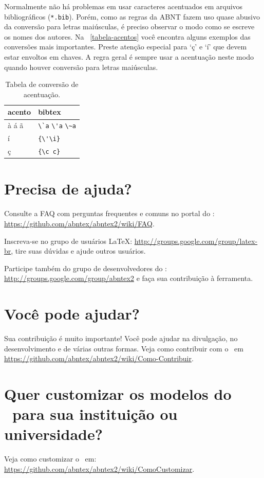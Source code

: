 Normalmente não há problemas em usar caracteres acentuados em arquivos
bibliográficos (\texttt{*.bib}). Porém, como as regras da ABNT fazem uso quase
abusivo da conversão para letras maiúsculas, é preciso observar o modo como se
escreve os nomes dos autores. Na ~\autoref{tabela-acentos} você encontra alguns
exemplos das conversões mais importantes. Preste atenção especial para `ç' e `í'
que devem estar envoltos em chaves. A regra geral é sempre usar a acentuação
neste modo quando houver conversão para letras maiúsculas.

\begin{table}[htbp]
\caption{Tabela de conversão de acentuação.}
\label{tabela-acentos}

\begin{center}
\begin{tabular}{ll}
	\toprule
		acento & \textsf{bibtex}\\
		\midrule
		à á ã & \verb+\`a+ \verb+\'a+ \verb+\~a+\\
		í & \verb+{\'\i}+\\
		ç & \verb+{\c c}+\\
	\bottomrule
\end{tabular}
\end{center}
\end{table}


\section{Precisa de ajuda?}

Consulte a FAQ com perguntas frequentes e comuns no portal do \abnTeX:
\url{https://github.com/abntex/abntex2/wiki/FAQ}.

Inscreva-se no grupo de usuários \LaTeX:
\url{http://groups.google.com/group/latex-br}, tire suas dúvidas e ajude
outros usuários.

Participe também do grupo de desenvolvedores do \abnTeX:
\url{http://groups.google.com/group/abntex2} e faça sua contribuição à
ferramenta.

\section{Você pode ajudar?}

Sua contribuição é muito importante! Você pode ajudar na divulgação, no
desenvolvimento e de várias outras formas. Veja como contribuir com o \abnTeX\
em \url{https://github.com/abntex/abntex2/wiki/Como-Contribuir}.

\section{Quer customizar os modelos do \abnTeX\ para sua instituição ou
universidade?}

Veja como customizar o \abnTeX\ em:
\url{https://github.com/abntex/abntex2/wiki/ComoCustomizar}.


